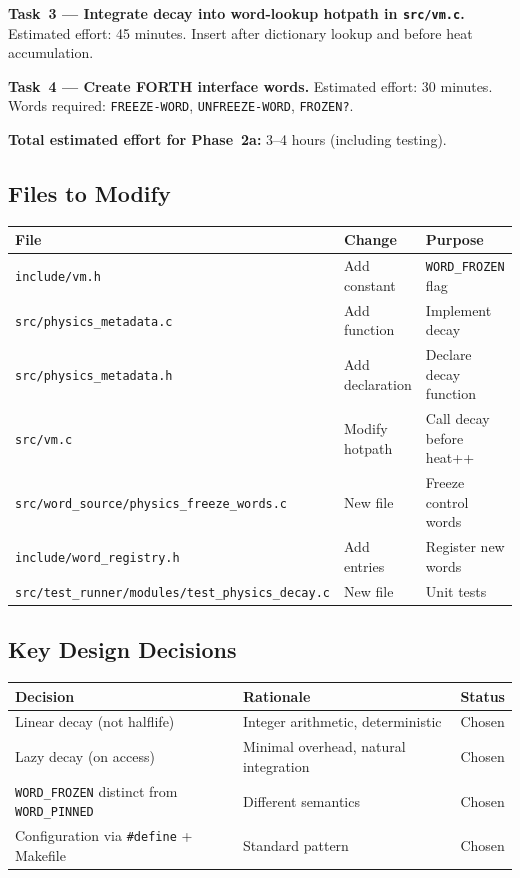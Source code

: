 \textbf{Task~3 — Integrate decay into word-lookup hotpath in
\texttt{src/vm.c}.}
Estimated effort: 45 minutes. Insert after dictionary lookup and before
heat accumulation.

\textbf{Task~4 — Create FORTH interface words.}
Estimated effort: 30 minutes. Words required: \texttt{FREEZE-WORD},
\texttt{UNFREEZE-WORD}, \texttt{FROZEN?}.

\textbf{Total estimated effort for Phase~2a:} 3--4 hours (including testing).

\subsection{Files to Modify}

\begin{center}
\begin{tabular}{lll}
\toprule
File & Change & Purpose \\
\midrule
\texttt{include/vm.h}               & Add constant   & \texttt{WORD\_FROZEN} flag \\
\texttt{src/physics\_metadata.c}    & Add function   & Implement decay \\
\texttt{src/physics\_metadata.h}    & Add declaration & Declare decay function \\
\texttt{src/vm.c}                   & Modify hotpath & Call decay before heat++ \\
\texttt{src/word\_source/physics\_freeze\_words.c} & New file & Freeze control words \\
\texttt{include/word\_registry.h}   & Add entries    & Register new words \\
\texttt{src/test\_runner/modules/test\_physics\_decay.c} & New file & Unit tests \\
\bottomrule
\end{tabular}
\end{center}

\subsection{Key Design Decisions}

\begin{center}
\begin{tabular}{lll}
\toprule
Decision & Rationale & Status \\
\midrule
Linear decay (not halflife) & Integer arithmetic, deterministic & Chosen \\
Lazy decay (on access)      & Minimal overhead, natural integration & Chosen \\
\texttt{WORD\_FROZEN} distinct from \texttt{WORD\_PINNED} & Different semantics & Chosen \\
Configuration via \texttt{\#define} + Makefile & Standard pattern & Chosen \\
\bottomrule
\end{tabular}
\end{center}

